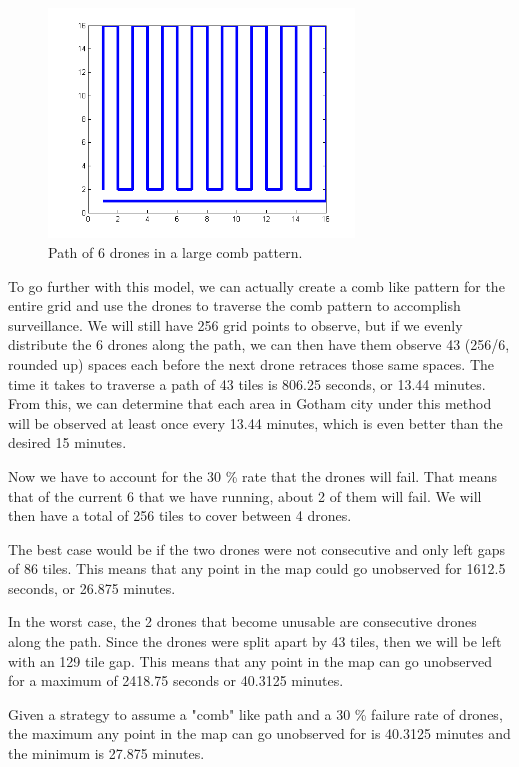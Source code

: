 \documentclass{article}
\begin{document}
\begin{figure}[htb!]
\begin{center}
\includegraphics[width=3.2in]{Comb.png}
\end{center}
\caption{Path of 6 drones in a large comb pattern.
\label{Comb2}}
\end{figure} 

To go further with this model, we can actually create a comb like pattern for the entire grid and use the drones to traverse the comb pattern to accomplish surveillance. We will still have 256 grid points to observe, but if we evenly distribute the 6 drones along the path, we can then have them observe 43 (256/6, rounded up) spaces each before the next drone retraces those same spaces. The time it takes to traverse a path of 43 tiles is 806.25 seconds, or 13.44 minutes. From this, we can determine that each area in Gotham city under this method will be observed at least once every 13.44 minutes, which is even better than the desired 15 minutes. 

Now we have to account for the 30 \% rate that the drones will fail. That means that of the current 6 that we have running, about 2 of them will fail. We will then have a total of 256 tiles to cover between 4 drones. 

The best case would be if the two drones were not consecutive and only left gaps of 86 tiles. This means that any point in the map could go unobserved for 1612.5 seconds, or 26.875 minutes. 

In the worst case, the 2 drones that become unusable are consecutive drones along the path. Since the drones were split apart by 43 tiles, then we will be left with an 129 tile gap. This means that any point in the map can go unobserved for a maximum of 2418.75 seconds or 40.3125 minutes. 

Given a strategy to assume a "comb" like path and a 30 \% failure rate of drones, the maximum any point in the map can go unobserved for is 40.3125 minutes and the minimum is 27.875 minutes. 
\end{document}
